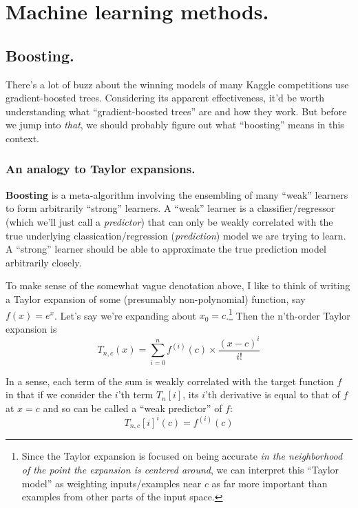 \documentclass[../main/main.tex]{subfiles}
\begin{document}
\chapter{Machine learning methods.}\label{machine-learning-methods}



\section{Boosting.}\label{boosting}

There's a lot of buzz about the winning models of many Kaggle competitions 
use gradient-boosted trees. Considering its apparent effectiveness, it'd be worth understanding
what ``gradient-boosted trees'' are and how they work. But before we jump into \emph{that}, 
we should probably figure out what ``boosting'' means in this context.

\subsection{An analogy to Taylor expansions.}


\textbf{Boosting} is a meta-algorithm involving
the ensembling of many ``weak'' learners to form arbitrarily ``strong'' learners.
A ``weak'' learner is a classifier/regressor (which we'll just call a \emph{predictor}) 
that can only be weakly correlated with the true underlying 
classication/regression (\emph{prediction}) model we are trying to 
learn. A ``strong'' learner should be able to approximate the true prediction model
arbitrarily closely.

To make sense of the somewhat vague denotation above, 
I like to think of writing a Taylor expansion of some (presumably non-polynomial)
function, say \(f(x) = e^x\). Let's say we're expanding about \(x_0 = c\).\footnote{
  Since the Taylor expansion is focused on being accurate
  \emph{in the neighborhood of the point the expansion is centered around}, 
  we can interpret this ``Taylor model'' as weighting inputs/examples near \(c\) 
  as far more important than examples from other parts of the input space.
} 
Then the n'th-order Taylor expansion is
\[ T_{n,c}(x) = \sum_{i=0}^{n} f^{(i)}(c) \times \frac{(x-c)^i}{i!}\]

In a sense, each term of the sum is weakly correlated with the target function $f$ in that
if we consider the \(i\)'th term \(T_n[i]\), its \(i\)'th derivative is equal to 
that of \(f\) at \(x = c\) and so can be called a ``weak predictor'' of \(f\):
\[T_{n,c}[i]^{{i}}(c) = f^{(i)}(c) \]
\end{document}
